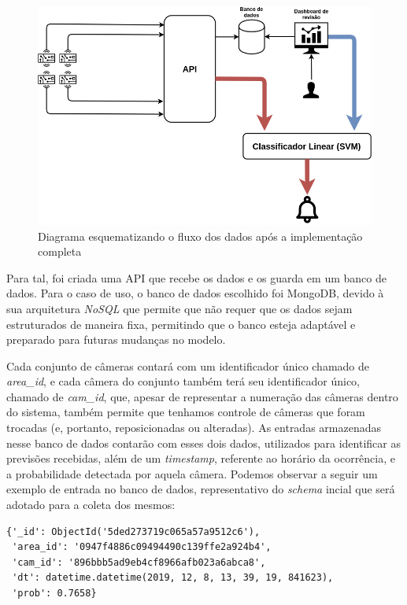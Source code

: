 \documentclass[]{politex}
\begin{document}
\begin{itemize}
  \begin{figure}[ht]
  \centering
  \includegraphics[scale=0.4]{img/fluxofinal.png}
  \caption{Diagrama esquematizando o fluxo dos dados após a implementação completa}
  \label{fig:fluxofinal}
\end{figure}
\end{itemize}

Para tal, foi criada uma API que recebe os dados e os guarda em um banco de dados. Para o caso de uso, o banco de dados escolhido foi MongoDB, devido à sua arquitetura \textit{NoSQL} que permite que não requer que os dados sejam estruturados de maneira fixa, permitindo que o banco esteja adaptável e preparado para futuras mudanças no modelo.

Cada conjunto de câmeras contará com um identificador único chamado de \textit{area\_id}, e cada câmera do conjunto também terá seu identificador único, chamado de \textit{cam\_id}, que, apesar de representar a numeração das câmeras dentro do sistema, também permite que tenhamos controle de câmeras que foram trocadas (e, portanto, reposicionadas ou alteradas). As entradas armazenadas nesse banco de dados contarão com esses dois dados, utilizados para identificar as previsões recebidas, além de um \textit{timestamp}, referente ao horário da ocorrência, e a probabilidade detectada por aquela câmera. Podemos observar a seguir um exemplo de entrada no banco de dados, representativo do \textit{schema} incial que será adotado para a coleta dos mesmos:

\begin{lstlisting}
{'_id': ObjectId('5ded273719c065a57a9512c6'),
 'area_id': '0947f4886c09494490c139ffe2a924b4',
 'cam_id': '896bbb5ad9eb4cf8966afb023a6abca8',
 'dt': datetime.datetime(2019, 12, 8, 13, 39, 19, 841623),
 'prob': 0.7658}
\end{lstlisting}
\end{document}
